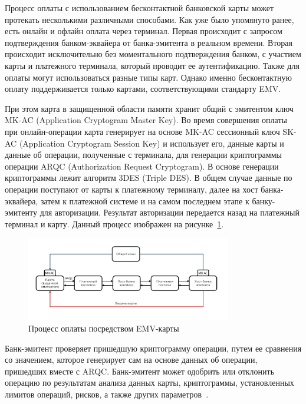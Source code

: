 Процесс оплаты с использованием бесконтактной банковской карты может протекать несколькими различными способами.
Как уже было упомянуто ранее, есть онлайн и офлайн оплата через терминал.
Первая происходит с запросом подтверждения банком-эквайера от банка-эмитента в реальном времени.
Вторая происходит исключительно без моментального подтверждения банком, с участием карты и платежного терминала, который проводит ее аутентификацию.
Также для оплаты могут использоваться разные типы карт.
Однако именно бесконтактную оплату поддерживается только картами, соответствующими стандарту EMV.

При этом карта в защищенной области памяти хранит общий с эмитентом ключ MK-AC (Application Cryptogram Master Key).
Во время совершения оплаты при онлайн-операции карта генерирует на основе MK-AC сессионный ключ SK-AC (Application Cryptogram Session Key) и использует его, данные карты и данные об операции, полученные с терминала, для генерации криптограммы операции ARQC (Authorization Request Cryptogram).
В основе генерации криптограммы лежит алгоритм 3DES (Triple DES).
В общем случае данные по операции поступают от карты к платежному терминалу, далее на хост банка-эквайера, затем к платежной системе и на самом последнем этапе к банку-эмитенту для авторизации.
Результат авторизации передается назад на платежный терминал и карту.
Данный процесс изображен на рисунке~\ref{fig:emv_card_payment}.

\begin{figure}[H]
    \centering
    \includegraphics[width=0.8\textwidth]{images/research/emv_card_payment}
    \caption{\centering Процесс оплаты посредством EMV-карты}
    \label{fig:emv_card_payment}
\end{figure}

Банк-эмитент проверяет пришедшую криптограмму операции, путем ее сравнения со значением, которое генерирует сам на основе данных об операции, пришедших вместе с ARQC.
Банк-эмитент может одобрить или отклонить операцию по результатам анализа данных карты, криптограммы, установленных лимитов операций, рисков, а также других параметров~\cite{habr_nspk_mir_payment}.

